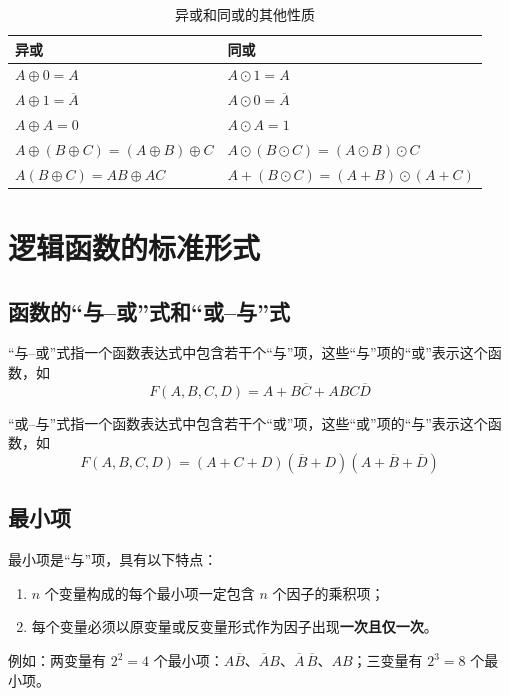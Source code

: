 \begin{table}[H]
\centering
\caption{异或和同或的其他性质}
\label{tab:常用公式:异或同或性质}
\begin{tabular}{ll}
	\toprule
	异或 & 同或 \\
	\midrule
	$A\oplus0=A$ & $A\odot1=A$ \\
	$A\oplus1=\overline{A}$ & $A\odot0=\overline{A}$ \\
	$A\oplus A=0$ & $A\odot A=1$ \\
	$A\oplus(B\oplus C)=(A\oplus B)\oplus C$ & $A\odot(B\odot C)=(A\odot B)\odot C$ \\
	$A(B\oplus C)=AB\oplus AC$ & $A+(B\odot C)=(A+B)\odot(A+C)$ \\
	\bottomrule
\end{tabular}
\end{table}

\section{逻辑函数的标准形式}
\label{sec:逻辑函数的标准形式}

\subsection{函数的“与--或”式和“或--与”式}
\label{sec:与或式和或与式}

\begin{definition}[“与--或”式]
	“与--或”式指一个函数表达式中包含若干个“与”项，这些“与”项的“或”表示这个函数，如
	\begin{equation}
		F(A,B,C,D)=A+B\overline{C}+ABC\overline{D}
		\label{eq:标准形式:与或式}
	\end{equation}
\end{definition}

\begin{definition}[“或--与”式]
	“或--与”式指一个函数表达式中包含若干个“或”项，这些“或”项的“与”表示这个函数，如
	\begin{equation}
		F(A,B,C,D)=(A+C+D)(\overline{B}+D)(A+\overline{B}+\overline{D})
		\label{eq:标准形式:或与式}
	\end{equation}
\end{definition}

\subsection{最小项}
\label{sec:最小项}

\begin{definition}[最小项]
	最小项是“与”项，具有以下特点：
	\begin{enumerate}
		\item $n$ 个变量构成的每个最小项一定包含 $n$ 个因子的乘积项；
		\item 每个变量必须以原变量或反变量形式作为因子出现\textbf{一次且仅一次}。
	\end{enumerate}
	例如：两变量有 $2^2=4$ 个最小项：$A\overline{B}$、$\overline{A}B$、$\overline{A}\,\overline{B}$、$AB$；三变量有 $2^3=8$ 个最小项。
\end{definition}

